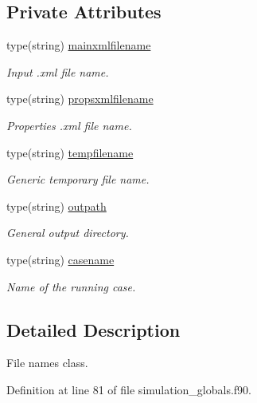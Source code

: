 \subsection*{Private Attributes}
\begin{DoxyCompactItemize}
\item 
type(string) \mbox{\hyperlink{structsimulation__globals__mod_1_1filenames__t_af3e0ecdd0ab881ea2c2dd0a430d99d93}{mainxmlfilename}}
\begin{DoxyCompactList}\small\item\em Input .xml file name. \end{DoxyCompactList}\item 
type(string) \mbox{\hyperlink{structsimulation__globals__mod_1_1filenames__t_ae9790bc76014d831bfad281ab63e6f4c}{propsxmlfilename}}
\begin{DoxyCompactList}\small\item\em Properties .xml file name. \end{DoxyCompactList}\item 
type(string) \mbox{\hyperlink{structsimulation__globals__mod_1_1filenames__t_a207bede622cac14f7baef87cf0c000b7}{tempfilename}}
\begin{DoxyCompactList}\small\item\em Generic temporary file name. \end{DoxyCompactList}\item 
type(string) \mbox{\hyperlink{structsimulation__globals__mod_1_1filenames__t_a1d5cd63adaafefa1f4f39adda35f350e}{outpath}}
\begin{DoxyCompactList}\small\item\em General output directory. \end{DoxyCompactList}\item 
type(string) \mbox{\hyperlink{structsimulation__globals__mod_1_1filenames__t_ab4bb5a76bfc56f9c78edd9c205f79385}{casename}}
\begin{DoxyCompactList}\small\item\em Name of the running case. \end{DoxyCompactList}\end{DoxyCompactItemize}


\subsection{Detailed Description}
File names class. 

Definition at line 81 of file simulation\+\_\+globals.\+f90.



